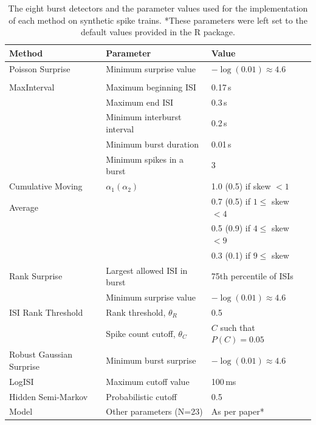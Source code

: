 \documentclass[12pt, titlepage]{article}
\begin{document}
			\begin{table}[h]
				\centering
				\begin{tabular}{|p{5cm}|l|l|}
					\hline
					Method & Parameter & Value
					\\ \hline \rowcolor{Gray}
					Poisson Surprise & Minimum surprise value & $-\log(0.01) \approx 4.6$
					\\
					\rowcolor{Gray} \cite{Legendy1985}&&\\ 
					\hline
					MaxInterval  & Maximum beginning ISI & 0.17$\,$s
					\\ \cite{NEmanual} & Maximum end ISI & 0.3$\,$s
					\\ & Minimum interburst interval & 0.2$\,$s
					\\ & Minimum burst duration & 0.01$\,$s
					\\& Minimum spikes in a burst & 3
					\\ \hline 
					\rowcolor{Gray} Cumulative Moving & $\alpha_1 (\alpha_2)$ & 1.0 (0.5) if skew $<1$
					\\ \rowcolor{Gray} Average & &  0.7 (0.5) if $1 \leq $ skew $<4$
					\\ \rowcolor{Gray} \cite{Kapucu2012} & & 0.5 (0.9) if $4 \leq $ skew $<9$
					\\ \rowcolor{Gray} & & 0.3 (0.1) if  $9 \leq$ skew 
					\\ \hline 
					Rank Surprise& Largest allowed ISI in burst & 75th percentile of ISIs\\
					\cite{Gourevitch2007} & Minimum surprise value& $-\log(0.01) \approx 4.6$
					\\ \hline 
					\rowcolor{Gray}	ISI Rank Threshold  & Rank threshold, $\theta_R$ & 0.5 \\
					\rowcolor{Gray}\cite{Hennig2011} & Spike count cutoff, $\theta_C$& $C$ such that $P(C)=0.05 $
					\\ \hline
					Robust Gaussian Surprise \cite{Ko2012} & Minimum burst surprise & $-\log(0.01) \approx 4.6$
					\\ \hline \rowcolor{Gray}   LogISI \cite{Pasquale2010} & Maximum cutoff value & 100$\,$ms
					\\ \hline
					Hidden Semi-Markov  & Probabilistic cutoff & 0.5
					\\  Model \cite{Tokdar2010}& Other parameters (N=23) & As per paper*
					\\ \hline
				\end{tabular}
				\caption{The eight burst detectors and the parameter values used for the implementation of each method on synthetic spike trains. *These parameters were left set to the default values provided in the R package. }
				\label{param_vals}
			\end{table}
\end{document}
